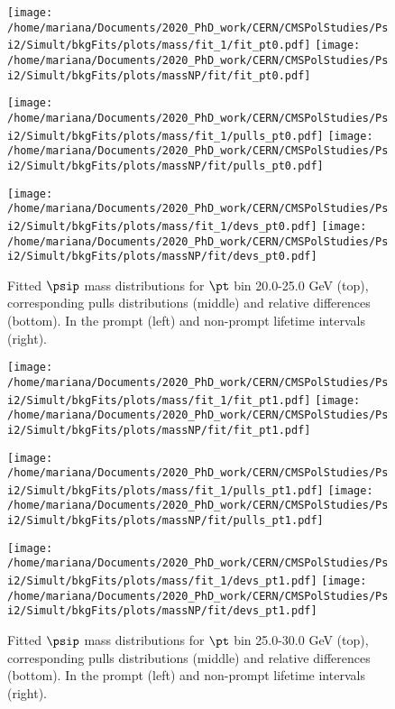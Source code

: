 \begin{figure}[h!]
\centering
\texttt{[image: /home/mariana/Documents/2020\_PhD\_work/CERN/CMSPolStudies/Psi2/Simult/bkgFits/plots/mass/fit\_1/fit\_pt0.pdf]}
\texttt{[image: /home/mariana/Documents/2020\_PhD\_work/CERN/CMSPolStudies/Psi2/Simult/bkgFits/plots/massNP/fit/fit\_pt0.pdf]}

\texttt{[image: /home/mariana/Documents/2020\_PhD\_work/CERN/CMSPolStudies/Psi2/Simult/bkgFits/plots/mass/fit\_1/pulls\_pt0.pdf]}
\texttt{[image: /home/mariana/Documents/2020\_PhD\_work/CERN/CMSPolStudies/Psi2/Simult/bkgFits/plots/massNP/fit/pulls\_pt0.pdf]}

\texttt{[image: /home/mariana/Documents/2020\_PhD\_work/CERN/CMSPolStudies/Psi2/Simult/bkgFits/plots/mass/fit\_1/devs\_pt0.pdf]}
\texttt{[image: /home/mariana/Documents/2020\_PhD\_work/CERN/CMSPolStudies/Psi2/Simult/bkgFits/plots/massNP/fit/devs\_pt0.pdf]}
\caption{Fitted $\psip$ mass distributions for $\pt$ bin 20.0-25.0 GeV (top), corresponding pulls distributions (middle) and relative differences (bottom). In the prompt (left) and non-prompt lifetime intervals (right).}\label{f:m_fit_0}
\end{figure}

\pagebreak

\begin{figure}[h!]
\centering
\texttt{[image: /home/mariana/Documents/2020\_PhD\_work/CERN/CMSPolStudies/Psi2/Simult/bkgFits/plots/mass/fit\_1/fit\_pt1.pdf]}
\texttt{[image: /home/mariana/Documents/2020\_PhD\_work/CERN/CMSPolStudies/Psi2/Simult/bkgFits/plots/massNP/fit/fit\_pt1.pdf]}

\texttt{[image: /home/mariana/Documents/2020\_PhD\_work/CERN/CMSPolStudies/Psi2/Simult/bkgFits/plots/mass/fit\_1/pulls\_pt1.pdf]}
\texttt{[image: /home/mariana/Documents/2020\_PhD\_work/CERN/CMSPolStudies/Psi2/Simult/bkgFits/plots/massNP/fit/pulls\_pt1.pdf]}

\texttt{[image: /home/mariana/Documents/2020\_PhD\_work/CERN/CMSPolStudies/Psi2/Simult/bkgFits/plots/mass/fit\_1/devs\_pt1.pdf]}
\texttt{[image: /home/mariana/Documents/2020\_PhD\_work/CERN/CMSPolStudies/Psi2/Simult/bkgFits/plots/massNP/fit/devs\_pt1.pdf]}
\caption{Fitted $\psip$ mass distributions for $\pt$ bin 25.0-30.0 GeV (top), corresponding pulls distributions (middle) and relative differences (bottom). In the prompt (left) and non-prompt lifetime intervals (right).}\label{f:m_fit_1}
\end{figure}

